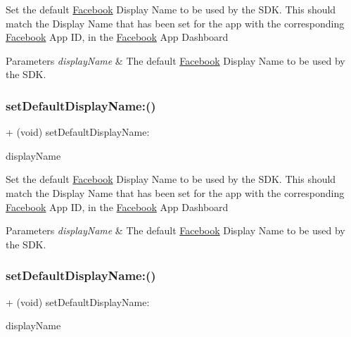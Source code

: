 Set the default \hyperlink{interfaceFacebook}{Facebook} Display Name to be used by the S\+DK. This should match the Display Name that has been set for the app with the corresponding \hyperlink{interfaceFacebook}{Facebook} App ID, in the \hyperlink{interfaceFacebook}{Facebook} App Dashboard


\begin{DoxyParams}{Parameters}
{\em display\+Name} & The default \hyperlink{interfaceFacebook}{Facebook} Display Name to be used by the S\+DK. \\
\hline
\end{DoxyParams}
\mbox{\label{interfaceFBSettings_a783ff4cf8b998eadfbfe2d95efef24a1}} 
\subsubsection{\texorpdfstring{set\+Default\+Display\+Name\+:()}{setDefaultDisplayName:()}\hspace{0.1cm}{\footnotesize\ttfamily [4/5]}}
{\footnotesize\ttfamily + (void) set\+Default\+Display\+Name\+: \begin{DoxyParamCaption}\item[{(N\+S\+String $\ast$)}]{display\+Name }\end{DoxyParamCaption}}

Set the default \hyperlink{interfaceFacebook}{Facebook} Display Name to be used by the S\+DK. This should match the Display Name that has been set for the app with the corresponding \hyperlink{interfaceFacebook}{Facebook} App ID, in the \hyperlink{interfaceFacebook}{Facebook} App Dashboard


\begin{DoxyParams}{Parameters}
{\em display\+Name} & The default \hyperlink{interfaceFacebook}{Facebook} Display Name to be used by the S\+DK. \\
\hline
\end{DoxyParams}
\mbox{\label{interfaceFBSettings_a783ff4cf8b998eadfbfe2d95efef24a1}} 
\subsubsection{\texorpdfstring{set\+Default\+Display\+Name\+:()}{setDefaultDisplayName:()}\hspace{0.1cm}{\footnotesize\ttfamily [5/5]}}
{\footnotesize\ttfamily + (void) set\+Default\+Display\+Name\+: \begin{DoxyParamCaption}\item[{(N\+S\+String $\ast$)}]{display\+Name }\end{DoxyParamCaption}}

